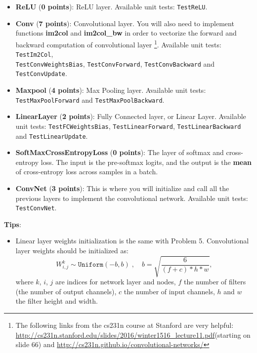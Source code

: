 \begin{itemize}

    \item {\bf ReLU} ({\bf 0 points}): ReLU layer. Available unit tests: \texttt{TestReLU}.
    
    \item {\bf Conv} ({\bf 7 points}): Convolutional layer. You will also need to implement functions \textbf{im2col} and \textbf{im2col\_bw} in order to vectorize the forward and backward computation of convolutional layer 
    \footnote{The following links from the cs231n course at Stanford are very helpful: \url{http://cs231n.stanford.edu/slides/2016/winter1516_lecture11.pdf}(starting on slide 66) and \url{http://cs231n.github.io/convolutional-networks/}}.  
    Available unit tests: \texttt{TestIm2Col}, \\ \texttt{TestConvWeightsBias}, \texttt{TestConvForward}, \texttt{TestConvBackward} and \texttt{TestConvUpdate}.
    
    \item {\bf Maxpool} ({\bf 4 points}): Max Pooling layer. Available unit tests: \texttt{TestMaxPoolForward} and \texttt{TestMaxPoolBackward}.
    
    \item {\bf LinearLayer} ({\bf 2 points}): Fully Connected layer, or Linear Layer. Available unit tests: \texttt{TestFCWeightsBias}, \texttt{TestLinearForward}, \texttt{TestLinearBackward} and \texttt{TestLinearUpdate}.
    
    \item {\bf SoftMaxCrossEntropyLoss} ({\bf 0 points}): The layer of softmax and cross-entropy loss. The input is the pre-softmax logits, and the output is the \textbf{mean} of cross-entropy loss across samples in a batch. 

    \item {\bf ConvNet} ({\bf 3 points}): This is where you will initialize and call all the previous layers to implement the convolutional network. Available unit tests: \texttt{TestConvNet}.
    
\end{itemize}
\pagebreak
\textbf{Tips}:
\begin{itemize}
    \item Linear layer weights initialization is the same with Problem 5. Convolutional layer weights should be initialized as: \[W^k_{i,j}\sim\texttt{Uniform}(-b,b) \;,\quad b=\sqrt{\frac{6}{(f+c)*h*w}}, \]
    where $k$, $i$, $j$ are indices for network layer and nodes, $f$ the number of filters (the number of output channels), $c$ the number of input channels, $h$ and $w$ the filter height and width.
\end{itemize}


